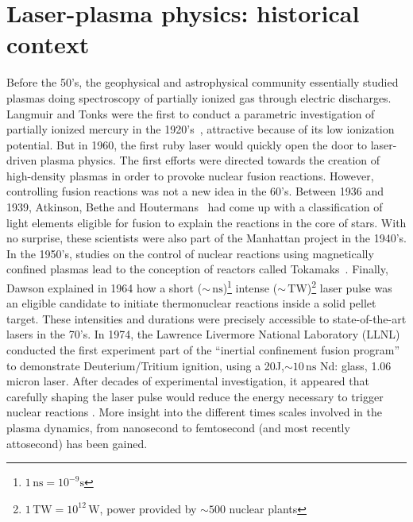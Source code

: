 \section{ Laser-plasma physics: historical context}

Before the 50's, the geophysical and astrophysical community essentially studied plasmas doing spectroscopy of partially ionized gas through electric discharges. 
 Langmuir and Tonks were the first to conduct a parametric investigation of partially ionized mercury in the 1920's~\cite{langmuir1923positive,TonksAndLangmuire}, attractive because of its low ionization potential. But in 1960, the first ruby laser would quickly open the door to laser-driven plasma physics. The first efforts were directed towards the creation of high-density plasmas in order to provoke nuclear fusion reactions. However, controlling fusion reactions was not a new idea in the 60's. Between 1936 and 1939, Atkinson, Bethe and Houtermans~\cite{atkinson,bethe1937nuclear,bethe1939energy} had come up with a classification of light elements eligible for fusion to explain the reactions in the core of stars. With no surprise, these scientists were also part of the Manhattan project in the 1940's. In the 1950's, studies on the control of nuclear reactions using magnetically confined plasmas lead to the conception of reactors called Tokamaks~\cite{artsimovich1945radiation,akhiezer1949interaction,rax2011physique}. Finally, Dawson explained in 1964\cite{dawson1964production} how a short ($\sim \,\mathrm{ns}$)\footnote{$1\,\mathrm{ns} = 10^{-9}\mathrm{s}$} intense ($\sim \,\mathrm{TW}$)\footnote{$1\,\mathrm{TW} = 10^{12}\,\mathrm{W}$, power provided by $\sim 500$ nuclear plants} laser pulse \cite{basov1964conditions,daiber1966laser} was an eligible candidate to initiate thermonuclear reactions inside a solid pellet target. These intensities and durations were precisely accessible to state-of-the-art lasers in the 70's\cite{brueckner1974laser}.
In 1974, the Lawrence Livermore National Laboratory (LLNL) conducted the first experiment part of the ``inertial confinement fusion program'' to demonstrate Deuterium/Tritium ignition, using a 20J,$\sim 10\,\mathrm{ns}$ Nd: glass, 1.06 micron laser. After decades of experimental investigation, it appeared that carefully shaping the laser pulse would reduce the energy necessary to trigger nuclear reactions . More insight into the different times scales involved in the plasma dynamics, from nanosecond to femtosecond (and most recently attosecond) has been gained. \\


